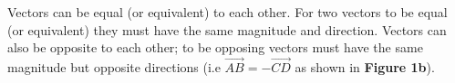 \documentclass[12.5pt]{article}
\begin{document}
\begin{flushleft}
\begin{itemize}
{\begin{center}

                    \end{center}
                                        
                } 

            \end{itemize}

            Vectors can be equal (or equivalent) to each other. For two vectors to be equal (or equivalent) 
            they must have the same magnitude and direction. Vectors can also be opposite to each other; to be
            opposing vectors must have the same magnitude but opposite directions (i.e $\vec{AB} = -\vec{CD}$ as shown in \textbf{Figure 1b}). 


\end{flushleft}
\end{document}

